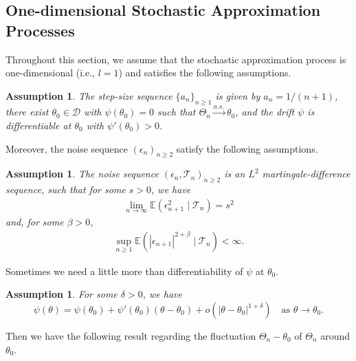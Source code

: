 \documentclass[12pt]{amsart}
\theoremstyle{plain}
\newtheorem{assumption}[theorem]{Assumption}
\theoremstyle{remark}
\numberwithin{equation}{section}
\begin{document}
\subsection{One-dimensional Stochastic Approximation Processes}\label{sec:sa1d}

Throughout this section, we assume that the stochastic approximation process is one-dimensional (i.e., $l=1$) and satisfies the following assumptions. 
\begin{assumption}\label{assum:n1}
    The step-size sequence $\{a_n\}_{n\geq 1}$ is given by $a_n = {1}/{(n+1)}$, there exist $\theta_0 \in \mathcal{D}$ with $\psi(\theta_0) = 0$ such that $\Theta_n \stackrel{a.s.}{\to}  \theta_0$, and the drift $\psi$ is differentiable at $\theta_0$ with $\psi'(\theta_0) >  0$.
\end{assumption}
Moreover, the noise sequence $\left({\epsilon}_{n}\right)_{n \geq 2}$ satisfy the following assumptions.
\begin{assumption}\label{assum:n2}
The noise sequence $\left({\epsilon}_{n}, \mathcal{T}_{n}\right)_{n \geq 2}$ is an $L^2$ martingale-difference sequence, such that %
for some $s > 0$, we have
\begin{align}\label{def:Sigma}
\lim_{n\to\infty}\mathbb{E}\left({\epsilon}_{n+1}^2 \mid \mathcal{T}_{n}\right) = s^2 %
\end{align}
and, for some $\beta > 0$, 
\begin{align*}%
        \sup_{n \geq 1} \mathbb{E}\left( |{\epsilon}_{n+1}|^{2+\beta} \mid \mathcal{T}_{n}\right) < \infty.
\end{align*}
\end{assumption}
Sometimes we need a little more than differentiability of $\psi$ at $\theta_0$.
\begin{assumption}\label{assum:n3}
    For some $\delta > 0$, we have
    \[\psi(\theta) = \psi(\theta_0) + \psi'(\theta_0)\left(\theta - \theta_0\right)  + o\left(|\theta - \theta_0|^{1+\delta}\right) \quad \text{as } \theta \to \theta_0.\] 
\end{assumption}
Then we have the following result regarding the fluctuation ${\Theta_n} - {\theta}_0$ of $\Theta_n$ around $\theta_0$.
\end{document}
